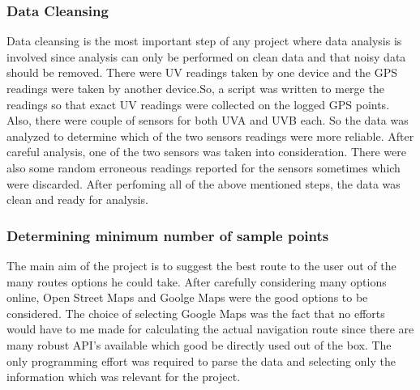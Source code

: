 \documentclass[10pt]{sigplan-proc-varsize}
\begin{document}
\subsubsection{Data Cleansing}
Data cleansing is the most important step of any project where data analysis is involved since analysis can only be performed on clean data and that noisy data should be removed. There were UV readings taken by one device and the GPS readings were taken by another device.So, a script was written to merge the readings so that exact UV readings were collected on the logged GPS points. Also, there were couple of sensors for both UVA and UVB each. So the data was analyzed to determine which of the two sensors readings were more reliable. After careful analysis, one of the two sensors was taken into consideration. There were also some random erroneous readings reported for the sensors sometimes which were discarded. After perfoming all of the above mentioned steps, the data was clean and ready for analysis.

\subsubsection{Determining minimum number of sample points}
The main aim of the project is to suggest the best route to the user out of the many routes options he could take. After carefully considering many options online, Open Street Maps \cite{openStreetMap} and Goolge Maps \cite{googleMapsOriginal} were the good options to be considered. The choice of selecting Google Maps was the fact that no efforts would have to me made for calculating the actual navigation route since there are many robust API's available which good be directly used out of the box. The only programming effort was required to parse the data and selecting only the information which was relevant for the project. 
\end{document}
